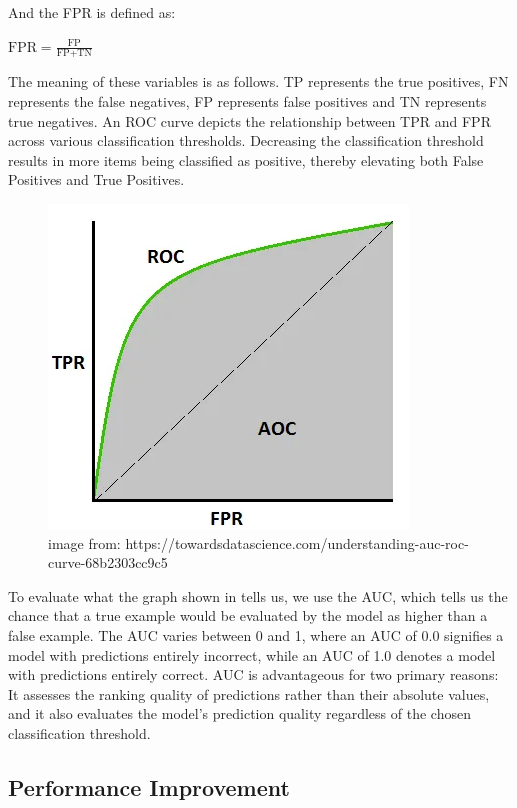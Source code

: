 \documentclass{l4proj}
\begin{document}
And the FPR is defined as: 

\begin{center}
    $\text{FPR} = \frac{\text{FP}}{\text{FP} + \text{TN}}$
\end{center}

The meaning of these variables is as follows. TP represents the true positives, FN represents the false negatives, FP represents false positives and TN represents true negatives. An ROC curve depicts the relationship between TPR and FPR across various classification thresholds. Decreasing the classification threshold results in more items being classified as positive, thereby elevating both False Positives and True Positives. \\ 

\begin{figure}[h]
    \centering
    \includegraphics[width=0.5\linewidth]{images/roc_auc.png}
    \caption{image from: https://towardsdatascience.com/understanding-auc-roc-curve-68b2303cc9c5}
    \label{fig:roc_auc}
\end{figure}

To evaluate what the graph shown in  tells us, we use the AUC, which tells us the chance that a true example would be evaluated by the model as higher than a false example. The AUC varies between 0 and 1, where an AUC of 0.0 signifies a model with predictions entirely incorrect, while an AUC of 1.0 denotes a model with predictions entirely correct. AUC is advantageous for two primary reasons: It assesses the ranking quality of predictions rather than their absolute values, and it also evaluates the model's prediction quality regardless of the chosen classification threshold. \\

\subsection{Performance Improvement}
\end{document}
